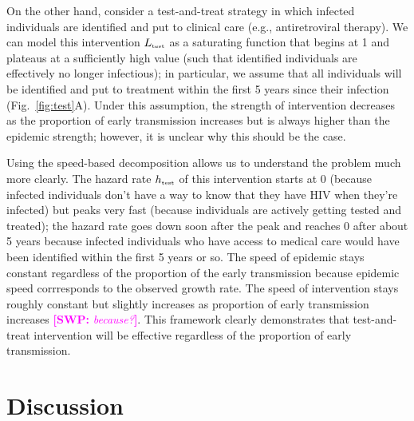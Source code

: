 \documentclass[12pt]{article}\usepackage[]{graphicx}\usepackage[]{color}
\newcommand{\comment}[3]{\textcolor{#1}{\textbf{[#2: }\textit{#3}\textbf{]}}}
\newcommand{\swp}[1]{\comment{magenta}{SWP}{#1}}
\newcommand{\tsub}[2]{#1_{{\textrm{\tiny #2}}}}
\newcommand{\figref}[1]{Fig.~\ref{fig:#1}}
\begin{document}
On the other hand, consider a test-and-treat strategy in which infected individuals are identified and put to clinical care (e.g., antiretroviral therapy).
We can model this intervention $\tsub{L}{test}$ as a saturating function that begins at 1 and plateaus at a sufficiently high value (such that identified individuals are effectively no longer infectious);
in particular, we assume that all individuals will be identified and put to treatment within the first 5 years since their infection (\figref{test}A).
Under this assumption, the strength of intervention decreases as the proportion of early transmission increases but is always higher than the epidemic strength; 
however, it is unclear why this should be the case.

Using the speed-based decomposition allows us to understand the problem much more clearly.
The hazard rate $\tsub{h}{test}$ of this intervention starts at 0 (because infected individuals don't have a way to know that they have HIV when they're infected) but peaks very fast (because individuals are actively getting tested and treated); 
the hazard rate goes down soon after the peak and reaches 0 after about 5 years because infected individuals who have access to medical care would have been identified within the first 5 years or so.
The speed of epidemic stays constant regardless of the proportion of the early transmission because epidemic speed corrresponds to the observed growth rate.
The speed of intervention stays roughly constant but slightly increases as proportion of early transmission increases \swp{because?}.
This framework clearly demonstrates that test-and-treat intervention will be effective regardless of the proportion of early transmission.

\section{Discussion}







\end{document}
